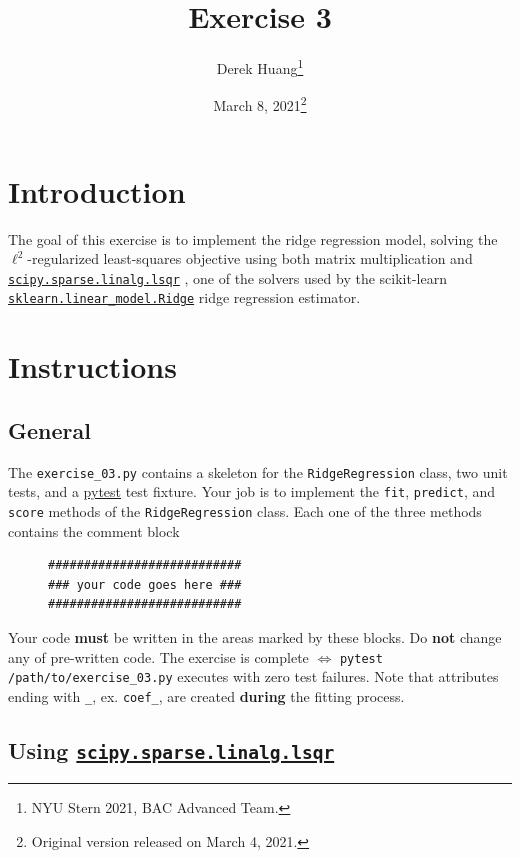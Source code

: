 \documentclass{article}
\title{Exercise 3}
\author{Derek Huang\thanks{NYU Stern 2021, BAC Advanced Team.}}
\date{March 8, 2021\thanks{Original version released on March 4, 2021.}}
\numberwithin{equation}{section}
\newcommand{\pytest}{%
    \href{https://docs.pytest.org/en/stable/}{pytest}%
}
\newcommand{\lsqr}{%
    \href{%
        https://docs.scipy.org/doc/scipy/reference/generated/%
        scipy.sparse.linalg.lsqr.html%
    }{\texttt{scipy.sparse.linalg.lsqr}}%
}
\newcommand{\skridge}{%
    \href{%
        https://scikit-learn.org/stable/modules/generated/%
        sklearn.linear_model.Ridge.html%
    }{\texttt{sklearn.linear\_model.Ridge}}%
}
\begin{document}
\maketitle
\thispagestyle{fancy}

\section{Introduction}

The goal of this exercise is to implement the ridge regression model,
solving the $ \ell^2 $-regularized least-squares objective using both
matrix multiplication and \lsqr, one of the solvers used by the scikit-learn
\skridge{} ridge regression estimator.

\section{Instructions}

\subsection{General}

The \texttt{exercise\_03.py} contains a skeleton for the
\texttt{RidgeRegression} class, two unit tests, and a \pytest{} test fixture.
Your job is to implement the \texttt{fit}, \texttt{predict}, and
\texttt{score} methods of the \texttt{RidgeRegression} class. Each one of the
three methods contains the comment block

\begin{figure}[h!]
	\centering
	\begin{BVerbatim}
###########################
### your code goes here ###
###########################
	\end{BVerbatim}
	\vspace{-5 pt}
\end{figure}

Your code \textbf{must} be written in the areas marked by these blocks. Do
\textbf{not} change any of pre-written code. The exercise is complete
$ \Leftrightarrow $ \texttt{pytest /path/to/exercise\_03.py} executes with
zero test failures. Note that attributes ending with \texttt{\_}, ex.
\texttt{coef\_}, are created \textbf{during} the fitting process.

\subsection{Using \lsqr}
\end{document}

